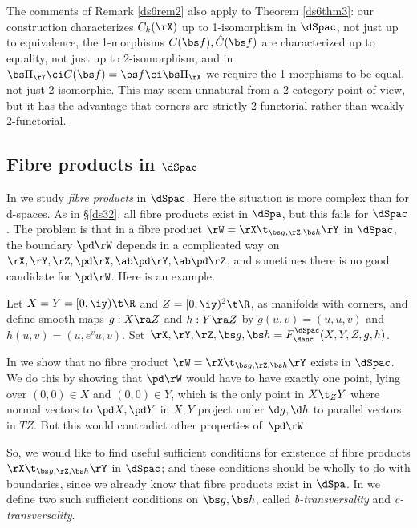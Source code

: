 \documentclass{article}
\begin{document}
The comments of Remark \ref{ds6rem2} also apply to Theorem
\ref{ds6thm3}: our construction characterizes $C_k(\rX)$ up to
1-isomorphism in $\dSpac$, not just up to equivalence, the
1-morphisms $C(\bs f),\hat C(\bs f)$ are characterized up to
equality, not just up to 2-isomorphism, and in $\bs\Pi_\rY\ci C(\bs
f)=\bs f\ci\bs\Pi_\rX$ we require the 1-morphisms to be equal, not
just 2-isomorphic. This may seem unnatural from a 2-category point
of view, but it has the advantage that corners are strictly
2-functorial rather than weakly 2-functorial.

\subsection{Fibre products in $\dSpac$}
\label{ds66}

In \cite[\S 6.8--\S 6.9]{Joyc6} we study {\it fibre products\/} in
$\dSpac$. Here the situation is more complex than for d-spaces. As
in \S\ref{ds32}, all fibre products exist in $\dSpa$, but this fails
for $\dSpac$. The problem is that in a fibre product $\rW=\rX\t_{\bs
g,\rZ,\bs h}\rY$ in $\dSpac$, the boundary $\pd\rW$ depends in a
complicated way on $\rX,\rY,\rZ,\pd\rX,\ab \pd\rY,\ab\pd\rZ$, and
sometimes there is no good candidate for $\pd\rW$. Here is an
example.

\begin{ex} Let $X=Y=[0,\iy)\t\R$ and $Z=[0,\iy)^2\t\R$, as
manifolds with corners, and define smooth maps $g:X\ra Z$ and
$h:Y\ra Z$ by $g(u,v)=(u,u,v)$ and $h(u,v)=(u,e^vu,v)$.
Set~$\rX,\rY,\rZ,\bs g,\bs h=F_\Manc^\dSpac(X,Y,Z,g,h)$.

In \cite[\S 6.8.6]{Joyc6} we show that no fibre product
$\rW=\rX\t_{\bs g,\rZ,\bs h}\rY$ exists in $\dSpac$. We do this by
showing that $\pd\rW$ would have to have exactly one point, lying
over $(0,0)\in X$ and $(0,0)\in Y$, which is the only point in
$X\t_ZY$ where normal vectors to $\pd X,\pd Y$ in $X,Y$ project
under $\d g,\d h$ to parallel vectors in $TZ$. But this would
contradict other properties of~$\pd\rW$.
\label{ds6ex}
\end{ex}

So, we would like to find useful sufficient conditions for existence
of fibre products $\rX\t_{\bs g,\rZ,\bs h}\rY$ in $\dSpac$; and
these conditions should be wholly to do with boundaries, since we
already know that fibre products exist in $\dSpa$. In \cite[\S
6.8.1]{Joyc6} we define two such sufficient conditions on $\bs g,\bs
h$, called {\it b-transversality\/} and {\it
c-transversality}.
\end{document}

